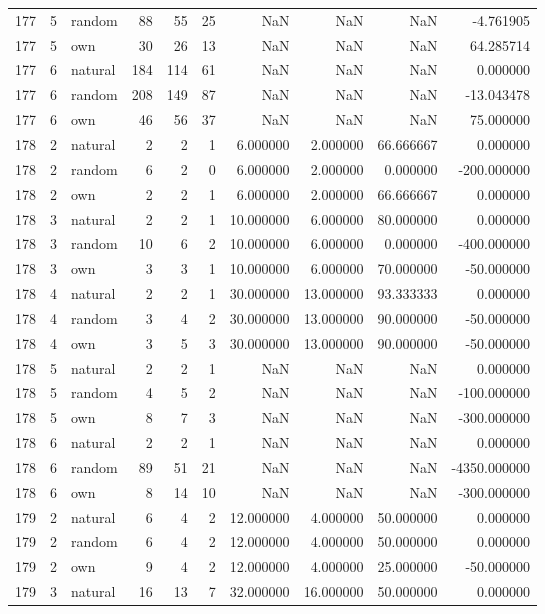 \begin{table}[htbp]
\begin{tabular}{rrlrrrrrrr}
177 & 5 & random & 88 & 55 & 25 & NaN & NaN & NaN & -4.761905 \\
177 & 5 & own & 30 & 26 & 13 & NaN & NaN & NaN & 64.285714 \\
177 & 6 & natural & 184 & 114 & 61 & NaN & NaN & NaN & 0.000000 \\
177 & 6 & random & 208 & 149 & 87 & NaN & NaN & NaN & -13.043478 \\
177 & 6 & own & 46 & 56 & 37 & NaN & NaN & NaN & 75.000000 \\
178 & 2 & natural & 2 & 2 & 1 & 6.000000 & 2.000000 & 66.666667 & 0.000000 \\
178 & 2 & random & 6 & 2 & 0 & 6.000000 & 2.000000 & 0.000000 & -200.000000 \\
178 & 2 & own & 2 & 2 & 1 & 6.000000 & 2.000000 & 66.666667 & 0.000000 \\
178 & 3 & natural & 2 & 2 & 1 & 10.000000 & 6.000000 & 80.000000 & 0.000000 \\
178 & 3 & random & 10 & 6 & 2 & 10.000000 & 6.000000 & 0.000000 & -400.000000 \\
178 & 3 & own & 3 & 3 & 1 & 10.000000 & 6.000000 & 70.000000 & -50.000000 \\
178 & 4 & natural & 2 & 2 & 1 & 30.000000 & 13.000000 & 93.333333 & 0.000000 \\
178 & 4 & random & 3 & 4 & 2 & 30.000000 & 13.000000 & 90.000000 & -50.000000 \\
178 & 4 & own & 3 & 5 & 3 & 30.000000 & 13.000000 & 90.000000 & -50.000000 \\
178 & 5 & natural & 2 & 2 & 1 & NaN & NaN & NaN & 0.000000 \\
178 & 5 & random & 4 & 5 & 2 & NaN & NaN & NaN & -100.000000 \\
178 & 5 & own & 8 & 7 & 3 & NaN & NaN & NaN & -300.000000 \\
178 & 6 & natural & 2 & 2 & 1 & NaN & NaN & NaN & 0.000000 \\
178 & 6 & random & 89 & 51 & 21 & NaN & NaN & NaN & -4350.000000 \\
178 & 6 & own & 8 & 14 & 10 & NaN & NaN & NaN & -300.000000 \\
179 & 2 & natural & 6 & 4 & 2 & 12.000000 & 4.000000 & 50.000000 & 0.000000 \\
179 & 2 & random & 6 & 4 & 2 & 12.000000 & 4.000000 & 50.000000 & 0.000000 \\
179 & 2 & own & 9 & 4 & 2 & 12.000000 & 4.000000 & 25.000000 & -50.000000 \\
179 & 3 & natural & 16 & 13 & 7 & 32.000000 & 16.000000 & 50.000000 & 0.000000 \\

\end{tabular}
\end{table}
